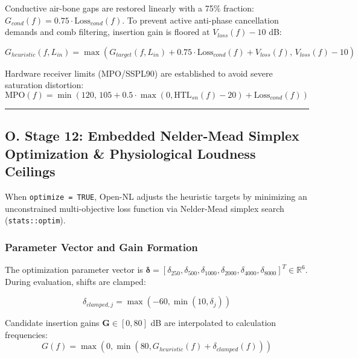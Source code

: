 \documentclass[
]{article}
\begin{document}
Conductive air-bone gaps are restored linearly with a 75\% fraction:
\(G_{cond}(f) = 0.75 \cdot \text{Loss}_{cond}(f)\). To prevent active
anti-phase cancellation demands and comb filtering, insertion gain is
floored at \(V_{loss}(f) - 10\) dB:

\begin{equation}
G_{heuristic}(f, L_{in}) = \max\left(G_{target}(f, L_{in}) + 0.75 \cdot \text{Loss}_{cond}(f) + V_{loss}(f),\, V_{loss}(f) - 10\right)
\end{equation}

Hardware receiver limits (MPO/SSPL90) are established to avoid severe
saturation distortion: \begin{equation}
\text{MPO}(f) = \min\left(120,\, 105 + 0.5 \cdot \max(0, \text{HTL}_{sn}(f) - 20) + \text{Loss}_{cond}(f)\right)
\end{equation}

\begin{center}\rule{0.5\linewidth}{0.5pt}\end{center}

\subsection{O. Stage 12: Embedded Nelder-Mead Simplex Optimization \&
Physiological Loudness
Ceilings}\label{o.-stage-12-embedded-nelder-mead-simplex-optimization-physiological-loudness-ceilings}

When \texttt{optimize\ =\ TRUE}, Open-NL adjusts the heuristic targets
by minimizing an unconstrained multi-objective loss function via
Nelder-Mead simplex search (\texttt{stats::optim}).

\subsubsection{Parameter Vector and Gain
Formation}\label{parameter-vector-and-gain-formation}

The optimization parameter vector is
\(\boldsymbol{\delta} = [\delta_{250}, \delta_{500}, \delta_{1000}, \delta_{2000}, \delta_{4000}, \delta_{8000}]^T \in \mathbb{R}^6\).
During evaluation, shifts are clamped:

\begin{equation}
\delta_{clamped, j} = \max(-60, \min(10, \delta_j))
\end{equation}

Candidate insertion gains \(\mathbf{G} \in [0, 80]\) dB are interpolated
to calculation frequencies: \begin{equation}
G(f) = \max\left(0, \min\left(80, G_{heuristic}(f) + \delta_{clamped}(f)\right)\right)
\end{equation}
\end{document}
